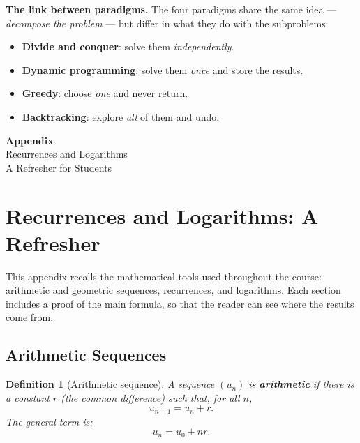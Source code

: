 \documentclass[11pt,a4paper]{article}
\newtheorem{definition}[theorem]{Definition}
\begin{document}
\textbf{The link between paradigms.} The four paradigms share the same idea --- \emph{decompose the problem} --- but differ in what they do with the subproblems:
\begin{itemize}
    \item \textbf{Divide and conquer}: solve them \emph{independently}.
    \item \textbf{Dynamic programming}: solve them \emph{once} and store the results.
    \item \textbf{Greedy}: choose \emph{one} and never return.
    \item \textbf{Backtracking}: explore \emph{all} of them and undo.
\end{itemize}

\newpage


\begin{center}
    \vspace*{5cm}
    {\Huge \textbf{Appendix}}\\[1cm]
    {\LARGE Recurrences and Logarithms}\\[2cm]
    {\large A Refresher for Students}
    \vfill
\end{center}

\newpage

\appendix
\section{Recurrences and Logarithms: A Refresher}

This appendix recalls the mathematical tools used throughout the course: arithmetic and geometric sequences, recurrences, and logarithms. Each section includes a proof of the main formula, so that the reader can see where the results come from.

\subsection{Arithmetic Sequences}

\begin{definition}[Arithmetic sequence]
A sequence $(u_n)$ is \textbf{arithmetic} if there is a constant $r$ (the \emph{common difference}) such that, for all $n$,
\[
u_{n+1} = u_n + r.
\]
The general term is:
\[
u_n = u_0 + n r.
\]
\end{definition}
\end{document}
